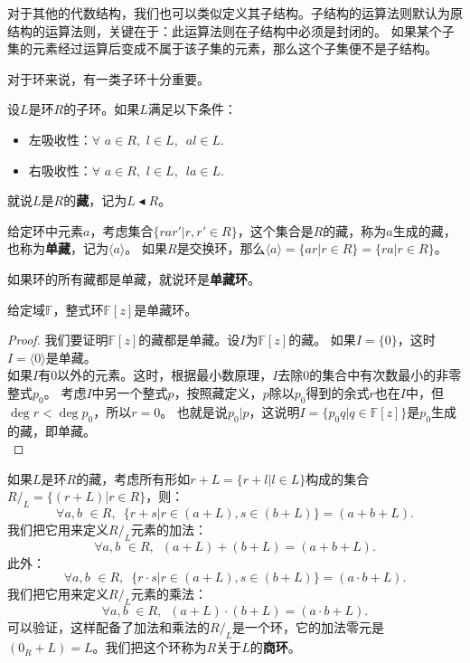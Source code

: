 \documentclass[12pt,UTF8]{ctexbook}
\begin{document}
\begin{appendix}
对于其他的代数结构，我们也可以类似定义其子结构。子结构的运算法则默认为原结构的运算法则，关键在于：此运算法则在子结构中必须是封闭的。
如果某个子集的元素经过运算后变成不属于该子集的元素，那么这个子集便不是子结构。

对于环来说，有一类子环十分重要。
\begin{df}\label{df:0_3_4}
    设$L$是环$R$的子环。如果$L$满足以下条件：
    \begin{itemize}
        \item 左吸收性：$\forall \,\, a \in R,\,\, l \in L, \,\,\, al \in L.$
        \item 右吸收性：$\forall\,\, a \in R,\,\, l \in L, \,\,\, la \in L.$
    \end{itemize}
    就说$L$是$R$的\textbf{藏}，记为$L \blacktriangleleft R$。
\end{df}

给定环中元素$a$，考虑集合$\{rar' | r, r' \in R\}$，这个集合是$R$的藏，称为$a$生成的藏，也称为\textbf{单藏}，记为$\langle a \rangle$。
如果$R$是交换环，那么$\langle a \rangle = \{ar | r \in R\}= \{ra | r \in R\}$。

如果环的所有藏都是单藏，就说环是\textbf{单藏环}。

\begin{pp}\label{pp:0_3_5}
    给定域$\mathbb{F}$，整式环$\mathbb{F}[z]$是单藏环。
\end{pp}
\begin{proof} %
    我们要证明$\mathbb{F}[z]$的藏都是单藏。设$I$为$\mathbb{F}[z]$的藏。
    如果$I = \{0\}$，这时$I = \langle 0 \rangle$是单藏。\\
    如果$I$有$0$以外的元素。这时，根据最小数原理，$I$去除$0$的集合中有次数最小的非零整式$p_0$。
    考虑$I$中另一个整式$p$，按照藏定义，$p$除以$p_0$得到的余式$r$也在$I$中，但$\deg r < \deg p_0$，所以$r = 0$。
    也就是说$p_0 | p$，这说明$I = \{p_0q | q \in \mathbb{F}[z]\}$是$p_0$生成的藏，即单藏。\\
\end{proof}

如果$L$是环$R$的藏，考虑所有形如$r + L = \{r + l|l\in L\}$构成的集合$R/_L = \{(r+L) | r \in R \}$，则：
$$ \forall a, b \,\, \in R, \,\,\, \{r + s | r \in (a + L), s \in (b + L)\} = (a + b + L).$$
我们把它用来定义$R/_L$元素的加法：
$$ \forall a, b \,\, \in R, \,\,\, (a + L) + (b + L)= (a + b + L).$$
此外：
$$ \forall a, b \,\, \in R, \,\,\, \{r \cdot s | r \in (a + L), s \in (b + L)\} = (a \cdot b + L).$$
我们把它用来定义$R/_L$元素的乘法：
$$ \forall a, b \,\, \in R, \,\,\, (a + L) \cdot (b + L)= (a \cdot b + L).$$
可以验证，这样配备了加法和乘法的$R/_L$是一个环，它的加法零元是$(0_R + L) = L$。我们把这个环称为$R$关于$L$的\textbf{商环}。


\end{appendix}
\end{document}
